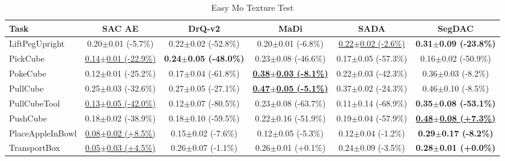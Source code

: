 \begin{table}[htbp]
\centering
\scriptsize
\caption{Easy Mo Texture Test}
\label{tab:appendix_motexturetest_easy}
\begin{adjustbox}{max width=\textwidth}
\begin{tabular}{l*{5}{c}}
\toprule
\textbf{Task} & \textbf{SAC AE} & \textbf{DrQ-v2} & \textbf{MaDi} & \textbf{SADA} & \textbf{SegDAC} \\
\midrule
LiftPegUpright & 0.20$\pm$0.01 \scriptsize{(-5.7\%)} & 0.22$\pm$0.02 \scriptsize{(-52.8\%)} & 0.20$\pm$0.01 \scriptsize{(-6.8\%)} & \underline{0.22$\pm$0.02 \scriptsize{(-2.6\%)}} & \textbf{0.31$\pm$0.09 \scriptsize{(-23.8\%)}} \\
PickCube & \underline{0.14$\pm$0.01 \scriptsize{(-22.9\%)}} & \textbf{0.24$\pm$0.05 \scriptsize{(-48.0\%)}} & 0.23$\pm$0.08 \scriptsize{(-46.6\%)} & 0.17$\pm$0.05 \scriptsize{(-57.3\%)} & 0.16$\pm$0.02 \scriptsize{(-50.9\%)} \\
PokeCube & 0.12$\pm$0.01 \scriptsize{(-25.2\%)} & 0.17$\pm$0.04 \scriptsize{(-61.8\%)} & \textbf{\underline{0.38$\pm$0.03 \scriptsize{(-8.1\%)}}} & 0.22$\pm$0.03 \scriptsize{(-42.3\%)} & 0.36$\pm$0.03 \scriptsize{(-8.2\%)} \\
PullCube & 0.25$\pm$0.03 \scriptsize{(-32.6\%)} & 0.27$\pm$0.05 \scriptsize{(-27.1\%)} & \textbf{\underline{0.47$\pm$0.05 \scriptsize{(-5.1\%)}}} & 0.37$\pm$0.02 \scriptsize{(-24.3\%)} & 0.46$\pm$0.10 \scriptsize{(-8.5\%)} \\
PullCubeTool & \underline{0.13$\pm$0.05 \scriptsize{(-42.0\%)}} & 0.12$\pm$0.07 \scriptsize{(-80.5\%)} & 0.23$\pm$0.08 \scriptsize{(-63.7\%)} & 0.11$\pm$0.14 \scriptsize{(-68.9\%)} & \textbf{0.35$\pm$0.08 \scriptsize{(-53.1\%)}} \\
PushCube & 0.18$\pm$0.02 \scriptsize{(-38.9\%)} & 0.18$\pm$0.10 \scriptsize{(-59.5\%)} & 0.22$\pm$0.16 \scriptsize{(-51.9\%)} & 0.19$\pm$0.04 \scriptsize{(-57.9\%)} & \textbf{\underline{0.48$\pm$0.08 \scriptsize{(+7.3\%)}}} \\
PlaceAppleInBowl & \underline{0.08$\pm$0.02 \scriptsize{(+8.5\%)}} & 0.15$\pm$0.02 \scriptsize{(-7.6\%)} & 0.12$\pm$0.05 \scriptsize{(-5.3\%)} & 0.12$\pm$0.04 \scriptsize{(-1.2\%)} & \textbf{0.29$\pm$0.17 \scriptsize{(-8.2\%)}} \\
TransportBox & \underline{0.05$\pm$0.03 \scriptsize{(+4.5\%)}} & 0.26$\pm$0.07 \scriptsize{(-1.1\%)} & 0.26$\pm$0.01 \scriptsize{(+0.1\%)} & 0.24$\pm$0.09 \scriptsize{(-3.5\%)} & \textbf{0.28$\pm$0.01 \scriptsize{(+0.0\%)}} \\
\bottomrule
\end{tabular}
\end{adjustbox}
\end{table}

